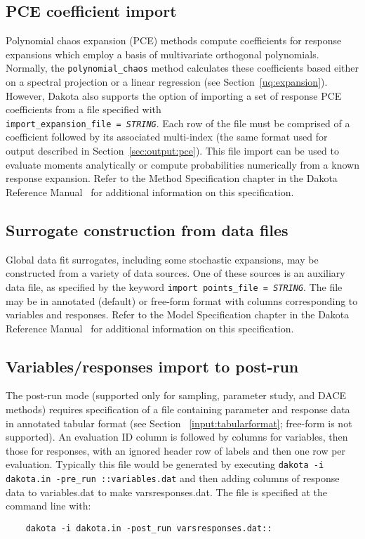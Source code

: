 \subsection{PCE coefficient import}

Polynomial chaos expansion (PCE) methods compute coefficients for
response expansions which employ a basis of multivariate orthogonal
polynomials.  Normally, the \texttt{polynomial\_chaos} method
calculates these coefficients based either on a spectral projection or
a linear regression (see Section~\ref{uq:expansion}).  However, Dakota
also supports the option of importing a set of response PCE
coefficients from a file specified with \\
\texttt{import\_expansion\_file = \emph{STRING}}.  Each row of the
file must be comprised of a coefficient followed by its associated
multi-index (the same format used for output described in
Section~\ref{sec:output:pce}).  This file import can be used to
evaluate moments analytically or compute probabilities numerically
from a known response expansion.  Refer to the Method Specification
chapter in the Dakota Reference Manual~\cite{RefMan} for additional
information on this specification.

\subsection{Surrogate construction from data files}

Global data fit surrogates, including some stochastic expansions, may
be constructed from a variety of data sources.  One of these sources
is an auxiliary data file, as specified by the keyword \texttt{import\
  points\_file = \emph{STRING}}.  The file may be in annotated
(default) or free-form format with columns corresponding to variables
and responses.  Refer to the Model Specification chapter in the Dakota
Reference Manual~\cite{RefMan} for additional information on this
specification.

\subsection{Variables/responses import to post-run}

The post-run mode (supported only for sampling, parameter study, and
DACE methods) requires specification of a file containing parameter
and response data in annotated tabular format (see Section
~\ref{input:tabularformat}; free-form is not supported).  An
evaluation ID column is followed by columns for variables, then those
for responses, with an ignored header row of labels and then one row
per evaluation.  Typically this file would be generated by executing
\texttt{dakota -i dakota.in -pre\_run ::variables.dat} and then adding
columns of response data to variables.dat to make varsresponses.dat.
The file is specified at the command line with:
\begin{small}
\begin{verbatim}
    dakota -i dakota.in -post_run varsresponses.dat::
\end{verbatim}
\end{small}

